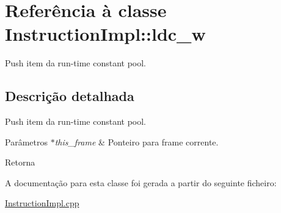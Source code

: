 \hypertarget{class_instruction_impl_1_1ldc__w}{}\section{Referência à classe Instruction\+Impl\+:\+:ldc\+\_\+w}
\label{class_instruction_impl_1_1ldc__w}


Push item da run-\/time constant pool.  




\subsection{Descrição detalhada}
Push item da run-\/time constant pool. 


\begin{DoxyParams}{Parâmetros}
{\em $\ast$this\+\_\+frame} & Ponteiro para frame corrente. \\
\hline
\end{DoxyParams}
\begin{DoxyReturn}{Retorna}

\end{DoxyReturn}


A documentação para esta classe foi gerada a partir do seguinte ficheiro\+:\begin{DoxyCompactItemize}
\item 
\hyperlink{_instruction_impl_8cpp}{Instruction\+Impl.\+cpp}\end{DoxyCompactItemize}
